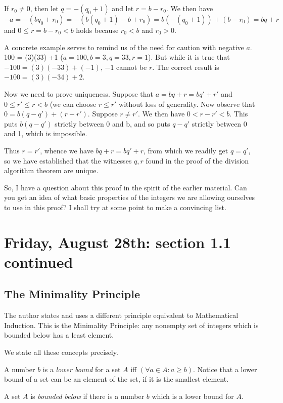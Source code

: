 \documentclass[12pt]{article}
\begin{document}
\begin{description}
If $r_0 \neq 0$, then let $q = -(q_0+1)$ and let $r = b-r_0$.  We then have $-a = -(bq_0+r_0) = -(b(q_0+1)-b+r_0) = b(-(q_0+1)) + (b-r_0) = bq+r$ and $0 \leq r = b-r_0 < b$ holds because $r_0<b$ and $r_0>0$.

A concrete example serves to remind us of the need for caution with negative $a$.  100 = (3)(33) +1 ($a=100, b=3, q = 33, r =1$).  But while it is true that $-100 = (3)(-33) + (-1)$, $-1$ cannot be $r$.  The correct result is $-100 = (3)(-34)+2$.

Now we need to prove uniqueness.  Suppose that $a=bq+r = bq'+r'$ and $0 \leq r' \leq r <b$ (we can choose
$r \leq r'$ without loss of generality.  Now observe that $0 = b(q-q') + (r-r')$.  Suppose $r \neq r'$.  We then have
$0 <r-r'<b$.  This puts $b(q-q')$ strictly between 0 and b, and so puts $q-q'$ strictly between 0 and 1, which is impossible.

Thus $r=r'$, whence we have $bq+r = bq'+r$, from which we readily get $q=q'$, so we have established that the witnesses $q,r$ found in the proof of the division algorithm theorem are unique.

So, I have a question about this proof in the spirit of the earlier material.  Can you get an idea of what basic properties of the integers we are allowing ourselves to use in this proof?  I shall try at some point to make a convincing list.

\end{description}

\section{Friday, August 28th:  section 1.1 continued}

\subsection{The Minimality Principle}

The author states and uses a different principle equivalent to Mathematical Induction.  This is the Minimality Principle:  any nonempty set of integers which is bounded below has a least element.

We state all these concepts precisely.

A number $b$ is a {\em lower bound\/} for a set $A$ iff $(\forall a \in A:a \geq b)$.  Notice that a lower bound of a set can be an element of the set, if it is the smallest element.

A set $A$ is {\em bounded below\/} if there is a number $b$ which is a lower bound for $A$.
\end{document}
